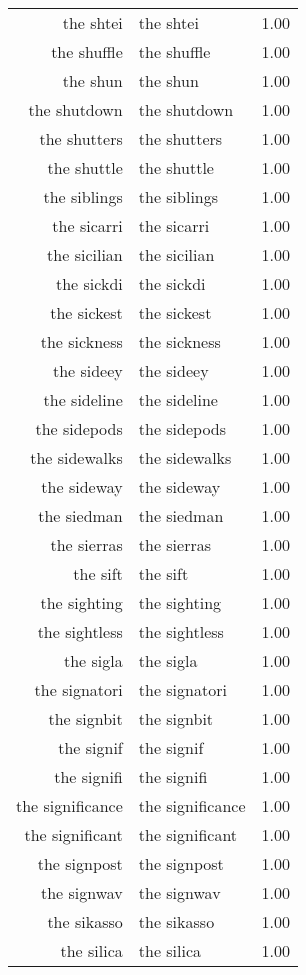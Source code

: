 \begin{table}[ht]
\begin{tabular}{rlr}
  the shtei & the shtei & 1.00 \\ 
  the shuffle & the shuffle & 1.00 \\ 
  the shun & the shun & 1.00 \\ 
  the shutdown & the shutdown & 1.00 \\ 
  the shutters & the shutters & 1.00 \\ 
  the shuttle & the shuttle & 1.00 \\ 
  the siblings & the siblings & 1.00 \\ 
  the sicarri & the sicarri & 1.00 \\ 
  the sicilian & the sicilian & 1.00 \\ 
  the sickdi & the sickdi & 1.00 \\ 
  the sickest & the sickest & 1.00 \\ 
  the sickness & the sickness & 1.00 \\ 
  the sideey & the sideey & 1.00 \\ 
  the sideline & the sideline & 1.00 \\ 
  the sidepods & the sidepods & 1.00 \\ 
  the sidewalks & the sidewalks & 1.00 \\ 
  the sideway & the sideway & 1.00 \\ 
  the siedman & the siedman & 1.00 \\ 
  the sierras & the sierras & 1.00 \\ 
  the sift & the sift & 1.00 \\ 
  the sighting & the sighting & 1.00 \\ 
  the sightless & the sightless & 1.00 \\ 
  the sigla & the sigla & 1.00 \\ 
  the signatori & the signatori & 1.00 \\ 
  the signbit & the signbit & 1.00 \\ 
  the signif & the signif & 1.00 \\ 
  the signifi & the signifi & 1.00 \\ 
  the significance & the significance & 1.00 \\ 
  the significant & the significant & 1.00 \\ 
  the signpost & the signpost & 1.00 \\ 
  the signwav & the signwav & 1.00 \\ 
  the sikasso & the sikasso & 1.00 \\ 
  the silica & the silica & 1.00 \\ 

\end{tabular}
\end{table}
